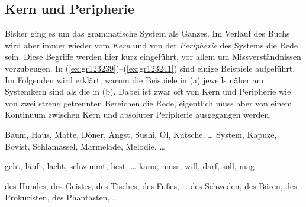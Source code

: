 \subsection{Kern und Peripherie}

\label{sec:kern}


Bisher ging es um das grammatische System als Ganzes.
Im Verlauf des Buchs wird aber immer wieder vom \textit{Kern} und von der \textit{Peripherie} des Systems die Rede sein.
Diese Begriffe werden hier kurz eingeführt, vor allem um Missverständnissen vorzubeugen.
In (\ref{ex:gr123239})--(\ref{ex:gr123241}) sind einige Beispiele aufgeführt.
Im Folgenden wird erklärt, warum die Beispiele in (a) jeweils näher am Systemkern sind als die in (b).
Dabei ist zwar oft von Kern und Peripherie wie von zwei streng getrennten Bereichen die Rede, eigentlich muss aber von einem Kontinuum zwischen Kern und absoluter Peripherie ausgegangen werden.

\begin{exe}
	\ex\label{ex:gr123239}
	\begin{xlist}
		\ex\label{ex:gr123239a} Baum, Haus, Matte, Döner, Angst, Sushi, Öl, Kutsche, \ldots
		\ex\label{ex:gr123239b} System, Kapuze, Bovist, Schlamassel, Marmelade, Melodie, \ldots
	\end{xlist}
	\ex\label{ex:gr123240}
	\begin{xlist}
		\ex\label{ex:gr123240a} geht, läuft, lacht, schwimmt, liest, \ldots
		\ex\label{ex:gr123240b} kann, muss, will, darf, soll, mag 
	\end{xlist}
	\ex\label{ex:gr123241}
	\begin{xlist}
		\ex\label{ex:gr123241a} des Hundes, des Geistes, des Tisches, des Fußes, \ldots
		\ex\label{ex:gr123241b} des Schweden, des Bären, des Prokuristen, des Phantasten, \ldots
	\end{xlist}
\end{exe}


